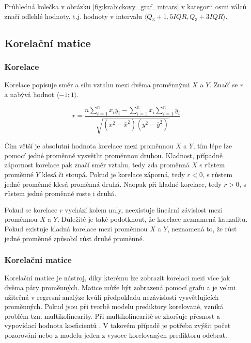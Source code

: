 Průhledná kolečka v obrázku \ref{fig:krabickovy_graf_mtcars} v kategorii osmi válců značí odlehlé hodnoty, t.j. hodnoty
v intervalu $\langle Q_3 + 1,5IQR, Q_3 + 3IQR \rangle$.


\subsection{Korelační matice}
\subsubsection{Korelace}
Korelace popisuje směr a sílu vztahu mezi dvěma proměnnými $X$ a $Y$. Značí se $r$ a nabývá hodnot $\langle -1; 1 \rangle$.

\begin{equation*}
r = \frac{n \sum_{i=1}^n x_i y_i - \sum_{i=1}^n x_i \sum_{i=1}^n y_i}
{\sqrt{(\overline{x^2} - \overline{x}^2)(\overline{y^2} - \overline{y}^2)}}
\end{equation*}

Čím větší je absolutní hodnota korelace mezi proměnnou $X$ a $Y$, tím lépe lze pomocí jedné proměnné vysvětlit proměnnou druhou. Kladnost, případně zápornost korelace
pak značí směr vztahu, tedy zda proměnná $X$ s růstem proměnné $Y$ klesá či stoupá. Pokud je korelace záporná, tedy $r < 0$, s růstem jedné proměnné klesá proměnná druhá.
Naopak při kladné korelace, tedy $r > 0$, s růstem jedné proměnné roste i druhá.

Pokud se korelace $r$ vychází kolem nuly, neexistuje lineární závislost mezi proměnnou $X$ a $Y$. Důležité je také podotknout, že korelace neznamená kauzalitu. Pokud
existuje kladná korelace mezi proměnnou $X$ a $Y$, neznamená to, že růst jedné proměnné způsobil růst druhé proměnné.  


\subsubsection{Korelační matice}
Korelační matice je nástroj, díky kterému lze zobrazit korelaci mezi více jak dvěma páry proměnných. Matice může být zobrazená pomocí grafu a
je velmi užitečná v regresní analýze kvůli předpokladu nezávislosti vysvětlujících proměnných.
Pokud jsou při tvorbě modelu prediktory korelované, vzniká problém tzn. multikolinearity. Při multikolinearitě se zhoršuje přesnost a 
vypovídací hodnota koeficientů \cite{kleinbaum_logistic_2010}. V takovém případě je potřeba zvýšit počet pozorování nebo z modelu jeden z vysoce 
korelovaných prediktorů odebrat. 


